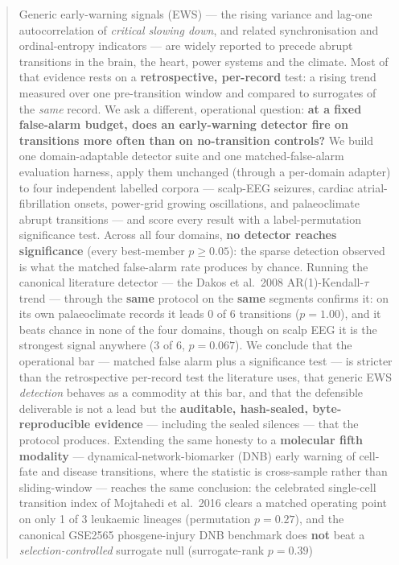 \documentclass[11pt]{article}
\begin{document}
\begin{abstract}
Generic early-warning signals (EWS) --- the rising variance and lag-one
autocorrelation of \emph{critical slowing down}, and related
synchronisation and ordinal-entropy indicators --- are widely reported to
precede abrupt transitions in the brain, the heart, power systems and the
climate. Most of that evidence rests on a \textbf{retrospective,
per-record} test: a rising trend measured over one pre-transition window
and compared to surrogates of the \emph{same} record. We ask a different,
operational question: \textbf{at a fixed false-alarm budget, does an
early-warning detector fire on transitions more often than on
no-transition controls?} We build one domain-adaptable detector suite and
one matched-false-alarm evaluation harness, apply them unchanged (through
a per-domain adapter) to four independent labelled corpora ---
scalp-EEG seizures, cardiac atrial-fibrillation onsets, power-grid
growing oscillations, and palaeoclimate abrupt transitions --- and score
every result with a label-permutation significance test. Across all four
domains, \textbf{no detector reaches significance} (every best-member
$p \ge 0.05$): the sparse detection observed is what the matched
false-alarm rate produces by chance. Running the canonical literature
detector --- the Dakos et al.\ 2008 AR(1)-Kendall-$\tau$ trend --- through
the \textbf{same} protocol on the \textbf{same} segments confirms it: on
its own palaeoclimate records it leads 0 of 6 transitions ($p = 1.00$),
and it beats chance in none of the four domains, though on scalp EEG it
is the strongest signal anywhere (3 of 6, $p = 0.067$). We conclude that
the operational bar --- matched false alarm plus a significance test ---
is stricter than the retrospective per-record test the literature uses,
that generic EWS \emph{detection} behaves as a commodity at this bar, and
that the defensible deliverable is not a lead but the \textbf{auditable,
hash-sealed, byte-reproducible evidence} --- including the sealed
silences --- that the protocol produces. Extending the same honesty to a
\textbf{molecular fifth modality} --- dynamical-network-biomarker (DNB)
early warning of cell-fate and disease transitions, where the statistic
is cross-sample rather than sliding-window --- reaches the same
conclusion: the celebrated single-cell transition index of Mojtahedi et
al.\ 2016 clears a matched operating point on only 1 of 3 leukaemic
lineages (permutation $p = 0.27$), and the canonical GSE2565
phosgene-injury DNB benchmark does \textbf{not} beat a
\emph{selection-controlled} surrogate null (surrogate-rank $p = 0.39$)

\end{abstract}
\end{document}
